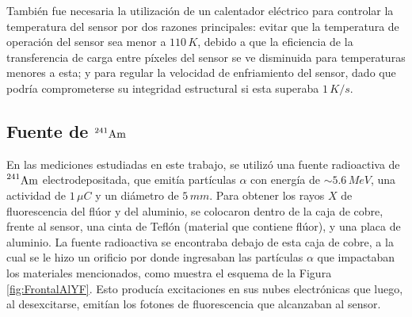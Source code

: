También fue necesaria la utilización de un calentador eléctrico para controlar la temperatura del sensor por dos razones principales: evitar que la temperatura de operación del sensor sea menor a $110\,\si{K}$, debido a que la eficiencia de la transferencia de carga entre píxeles del sensor se ve disminuida para temperaturas menores a esta; y para regular la velocidad de enfriamiento del sensor, dado que podría comprometerse su integridad estructural si esta superaba $1\,\si{K/s}$.

\subsection{Fuente de \texorpdfstring{$\prescript{241}{}{\mbox{Am}}$}{Am241}}
\noindent En las mediciones estudiadas en este trabajo, se utilizó una fuente radioactiva de $\prescript{241}{}{\mbox{Am}}$ electrodepositada, que emitía partículas $\alpha$ con energía de $\sim 5.6\,\si{MeV}$, una actividad de $1\,\si{\mu C}$ y un diámetro de $5\,\si{mm}$. 
Para obtener los rayos $X$ de fluorescencia del flúor y del aluminio, se colocaron dentro de la caja de cobre, frente al sensor, una cinta de Teflón (material que contiene flúor), y una placa de aluminio. La fuente radioactiva se encontraba debajo de esta caja de cobre, a la cual se le hizo un orificio por donde ingresaban las partículas $\alpha$ que impactaban los materiales mencionados, como muestra el esquema de la Figura \ref{fig:FrontalAlYF}. Esto producía excitaciones en sus nubes electrónicas que luego, al desexcitarse, emitían los fotones de fluorescencia que alcanzaban al sensor.
